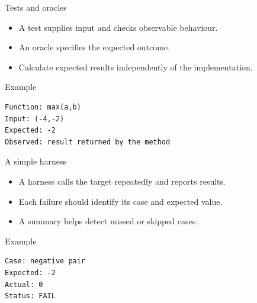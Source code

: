 \documentclass[10pt,aspectratio=169]{beamer}
\begin{document}
\begin{frame}[fragile,t]{Tests and oracles}
\begin{itemize}
\item A test supplies input and checks observable behaviour.
\item An oracle specifies the expected outcome.
\item Calculate expected results independently of the implementation.
\end{itemize}
\vspace{1mm}\begin{block}{Example}
\begin{lstlisting}
Function: max(a,b)
Input: (-4,-2)
Expected: -2
Observed: result returned by the method
\end{lstlisting}
\end{block}
\end{frame}

\begin{frame}[fragile,t]{A simple harness}
\begin{itemize}
\item A harness calls the target repeatedly and reports results.
\item Each failure should identify its case and expected value.
\item A summary helps detect missed or skipped cases.
\end{itemize}
\vspace{1mm}\begin{block}{Example}
\begin{lstlisting}
Case: negative pair
Expected: -2
Actual: 0
Status: FAIL
\end{lstlisting}
\end{block}
\end{frame}
\end{document}
